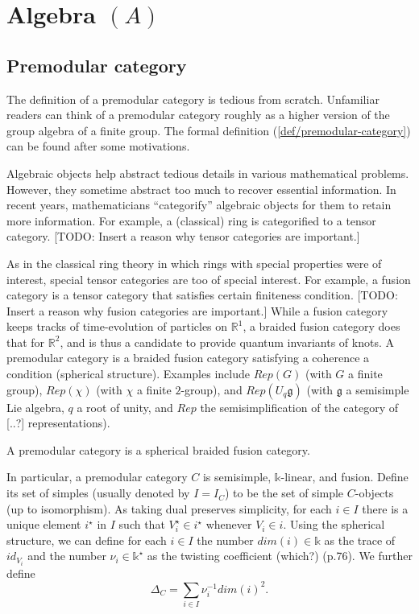 \section{Algebra $(A)$}
\subsection{Premodular category}

The definition of a premodular category is tedious from scratch.
Unfamiliar readers can think of a premodular category roughly as
a higher version of the group algebra of a finite group. The
formal definition (\ref{def/premodular-category}) can be found
after some motivations.

Algebraic objects help abstract tedious details in various
mathematical problems. However, they sometime abstract too much
to recover essential information. In recent years, mathematicians
``categorify'' algebraic objects for them to retain more
information. For example, a (classical) ring is categorified to a
tensor category. [TODO: Insert a reason why tensor categories are
important.]

As in the classical ring theory in which rings with special
properties were of interest, special tensor categories are too of
special interest. For example, a fusion category is a tensor
category that satisfies certain finiteness condition. [TODO:
Insert a reason why fusion categories are important.] While a
fusion category keeps tracks of time-evolution of particles on
$\mathbb{R}^{1}$, a braided fusion category does that for
$\mathbb{R}^{2}$, and is thus a candidate to provide quantum
invariants of knots. A premodular category is a braided fusion
category satisfying a coherence a condition (spherical
structure). Examples include $Rep(G)$ (with $G$ a finite group),
$Rep(\chi)$ (with $\chi$ a finite $2$-group), and
$Rep(U_{q}\mathfrak{g})$ (with $\mathfrak{g}$ a semisimple Lie
algebra, $q$ a root of unity, and $Rep$ the semisimplification of
the category of [..?] representations).

\begin{definition}\label{def/premodular-category}
  A premodular category is a spherical braided fusion category.
\end{definition}

\noindent In particular, a premodular category $C$ is semisimple,
$\mathbb{k}$-linear, and fusion. Define its set of simples
(usually denoted by $I = I_{C}$) to be the set of simple
$C$-objects (up to isomorphism). As taking dual preserves
simplicity, for each $i \in I$ there is a unique element
$i^{\star}$ in $I$ such that $V_{i}^{\star} \in i^{\star}$
whenever $V_{i} \in i$. Using the spherical structure, we can
define for each $i \in I$ the number $dim(i) \in \mathbb{k}$ as
the trace of $id_{V_{i}}$ and the number
$\nu_{i} \in \mathbb{k}^{\star}$ as the twisting coefficient
(which?) (p.76). We further define
$$\Delta_{C} = \sum_{i \in I} \nu_{i}^{-1}dim(i)^{2}.$$


